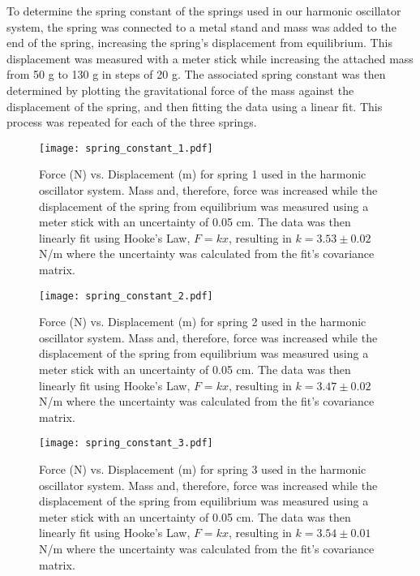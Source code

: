 To determine the spring constant of the springs used in our harmonic oscillator system, the spring was connected to a metal stand and mass was added to the end of the spring, increasing the spring's displacement from equilibrium. This displacement was measured with a meter stick while increasing the attached mass from 50 g to 130 g in steps of 20 g. The associated spring constant was then determined by plotting the gravitational force of the mass against the displacement of the spring, and then fitting the data using a linear fit. This process was repeated for each of the three springs.


\begin{figure}[H]
    \centering
	\texttt{[image: spring\_constant\_1.pdf]}
	\label{fig::spring1}
	\caption{Force (N) vs. Displacement (m) for spring 1 used in the harmonic oscillator system. Mass and, therefore, force was increased while the displacement of the spring from equilibrium was measured using a meter stick with an uncertainty of 0.05 cm. The data was then linearly fit using Hooke's Law, $F = kx$, resulting in $k = 3.53 \pm 0.02$ N/m where the uncertainty was calculated from the fit's covariance matrix.}
\end{figure}

\begin{figure}[H]
    \centering
	\texttt{[image: spring\_constant\_2.pdf]}
	\label{fig::spring2}
	\caption{Force (N) vs. Displacement (m) for spring 2 used in the harmonic oscillator system. Mass and, therefore, force was increased while the displacement of the spring from equilibrium was measured using a meter stick with an uncertainty of 0.05 cm. The data was then linearly fit using Hooke's Law, $F = kx$, resulting in $k = 3.47 \pm 0.02$ N/m where the uncertainty was calculated from the fit's covariance matrix.}
\end{figure}

\begin{figure}[H]
    \centering
	\texttt{[image: spring\_constant\_3.pdf]}
	\label{fig::spring3}
	\caption{Force (N) vs. Displacement (m) for spring 3 used in the harmonic oscillator system. Mass and, therefore, force was increased while the displacement of the spring from equilibrium was measured using a meter stick with an uncertainty of 0.05 cm. The data was then linearly fit using Hooke's Law, $F = kx$, resulting in $k = 3.54 \pm 0.01$ N/m where the uncertainty was calculated from the fit's covariance matrix.}
\end{figure}

